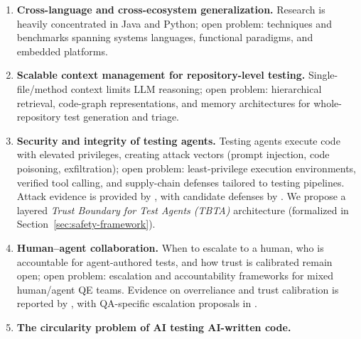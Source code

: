 \begin{enumerate}
        correctness of automated repairs under distributional UI and
        API drift. Empirical evidence on flaky-classifier limits is
        reported by \cite{alshammari2024flakyclassifiers,parry2023cannier,
        leinen2026detectedundetected}, systemic flakiness by
        \cite{parry2025systemic}, fix stability by \cite{lam2020lifecycle},
        and continuous scoring by \cite{meta2020pfs}. We propose
        \emph{Mutation-Gated Dual-Signal Heal Verification (MG-DSV)} as
        a candidate mechanism (formalized in
        Section~\ref{sec:safety-framework}).
  \item \textbf{Cross-language and cross-ecosystem generalization.}
        Research is heavily concentrated in Java and Python; open
        problem: techniques and benchmarks spanning systems languages,
        functional paradigms, and embedded platforms.
  \item \textbf{Scalable context management for repository-level testing.}
        Single-file/method context limits LLM reasoning; open problem:
        hierarchical retrieval, code-graph representations, and memory
        architectures for whole-repository test generation and triage.
  \item \textbf{Security and integrity of testing agents.} Testing agents
        execute code with elevated privileges, creating attack vectors
        (prompt injection, code poisoning, exfiltration); open problem:
        least-privilege execution environments, verified tool calling,
        and supply-chain defenses tailored to testing pipelines. Attack
        evidence is provided by
        \cite{zhan2024injecagent,debenedetti2024agentdojo,guo2024redcode,
        she2025queryipi,sakib2026trustverify,kozak2025developeraid}, with
        candidate defenses by
        \cite{shi2025progent,wu2024isolategpt,wu2026skillshield,
        xie2026vibeguard,kokkonis2025rosa}. We propose a layered
        \emph{Trust Boundary for Test Agents (TBTA)} architecture
        (formalized in Section~\ref{sec:safety-framework}).
  \item \textbf{Human--agent collaboration.} When to escalate to a
        human, who is accountable for agent-authored tests, and how
        trust is calibrated remain open; open problem: escalation and
        accountability frameworks for mixed human/agent QE teams.
        Evidence on overreliance and trust calibration is reported by
        \cite{passi2025overreliance,ibrahim2025overreliance,ibm2024trew},
        with QA-specific escalation proposals in \cite{kiran2026humanai}.
  \item \textbf{The circularity problem of AI testing AI-written code.}

\end{enumerate}

